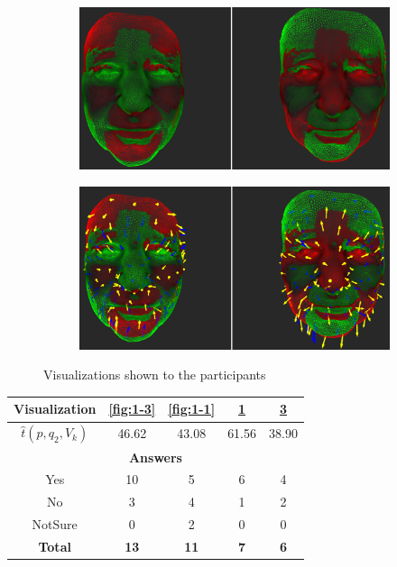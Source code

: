 \begin{figure}[h]
\begin{subfigure}{0.4\textwidth}
\includegraphics[width=\textwidth]{./screenshots/pair2.PNG}
\caption{}
\label{fig:1-2}
\end{subfigure}
\quad
\begin{subfigure}{0.4\textwidth}
\includegraphics[width=\textwidth]{./screenshots/pair4.PNG}
\caption{}
\label{fig:1-4}
\end{subfigure}
\caption{Visualizations shown to the participants}
\end{figure}
\medskip

\begin{center}
\begin{tabular}{| c | c | c | c | c |}
	\hline
	Visualization & \ref{fig:1-3} & \ref{fig:1-1} & \ref{fig:1-2} & \ref{fig:1-4}\\ \hline
	\(\widehat{t}(p, q_2, V_k)\) & 46.62 & 43.08 & 61.56 & 38.90\\ \hline
	\multicolumn{5}{|c|}{\bf Answers} \\ \hline
	Yes & 10 & 5 & 6 & 4\\ \hline
	No & 3 & 4 & 1 & 2\\ \hline
	NotSure & 0 & 2 & 0 & 0\\ \hline
	{\bf Total} & {\bf 13} & {\bf 11} & {\bf 7} & {\bf 6}\\ \hline
\end{tabular}
\end{center}
\clearpage

